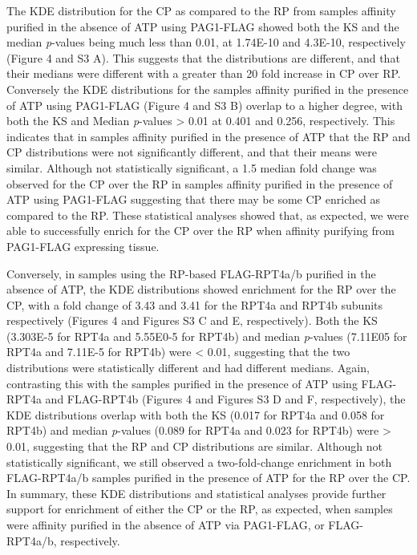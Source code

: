 The KDE distribution for the CP as compared to the RP from samples affinity purified in the absence of ATP using PAG1-FLAG showed both the KS and the median \textit{p}-values being much less than 0.01, at 1.74E-10 and 4.3E-10, respectively (Figure 4 and S3 A). This suggests that the distributions are different, and that their medians were different with a greater than 20 fold increase in CP over RP. Conversely the KDE distributions for the samples affinity purified in the presence of ATP using PAG1-FLAG (Figure 4 and S3 B) overlap to a higher degree, with both the KS and Median \textit{p}-values > 0.01 at 0.401 and 0.256, respectively. This indicates that in samples affinity purified in the presence of ATP that the RP and CP distributions were not significantly different, and that their means were similar. Although not statistically significant, a 1.5 median fold change was observed for the CP over the RP in samples affinity purified in the presence of ATP using PAG1-FLAG suggesting that there may be some CP enriched as compared to the RP. These statistical analyses showed that, as expected, we were able to successfully enrich for the CP over the RP when affinity purifying from PAG1-FLAG expressing tissue.

	Conversely, in samples using the RP-based FLAG-RPT4a/b purified in the absence of ATP, the KDE distributions showed enrichment for the RP over the CP, with a fold change of 3.43 and 3.41 for the RPT4a and RPT4b subunits respectively (Figures 4 and Figures S3 C and E, respectively). Both the KS (3.303E-5 for RPT4a and 5.55E0-5 for RPT4b) and median \textit{p}-values (7.11E05 for RPT4a and 7.11E-5 for RPT4b) were < 0.01, suggesting that the two distributions were statistically different and had different medians. Again, contrasting this with the samples purified in the presence of ATP using FLAG-RPT4a and FLAG-RPT4b (Figures 4 and Figures S3 D and F, respectively), the KDE distributions overlap with both the KS (0.017 for RPT4a and 0.058 for RPT4b) and median \textit{p}-values (0.089 for RPT4a and 0.023 for RPT4b) were > 0.01, suggesting that the RP and CP distributions are similar. Although not statistically significant, we still observed a two-fold-change enrichment in both FLAG-RPT4a/b samples purified in the presence of ATP for the RP over the CP. In summary, these KDE distributions and statistical analyses provide further support for enrichment of either the CP or the RP, as expected, when samples were affinity purified in the absence of ATP via PAG1-FLAG, or FLAG-RPT4a/b, respectively.

